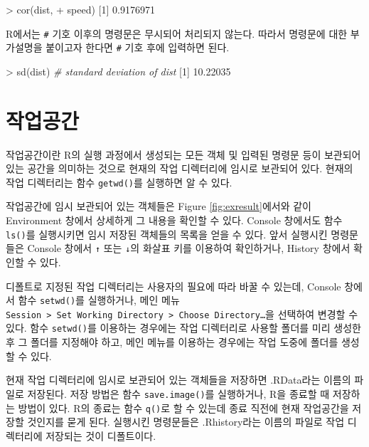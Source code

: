 \documentclass[
]{book}
\newenvironment{Shaded}{\begin{snugshade}}{\end{snugshade}}
\newcommand{\CommentTok}[1]{\textcolor[rgb]{0.56,0.35,0.01}{\textit{#1}}}
\newcommand{\DecValTok}[1]{\textcolor[rgb]{0.00,0.00,0.81}{#1}}
\newcommand{\FloatTok}[1]{\textcolor[rgb]{0.00,0.00,0.81}{#1}}
\newcommand{\FunctionTok}[1]{\textcolor[rgb]{0.00,0.00,0.00}{#1}}
\newcommand{\NormalTok}[1]{#1}
\newcommand{\SpecialCharTok}[1]{\textcolor[rgb]{0.00,0.00,0.00}{#1}}
\begin{document}
\begin{Shaded}
\begin{Highlighting}[]
\SpecialCharTok{\textgreater{}} \FunctionTok{cor}\NormalTok{(dist,}
\SpecialCharTok{+}\NormalTok{     speed)}
\NormalTok{[}\DecValTok{1}\NormalTok{] }\FloatTok{0.9176971}
\end{Highlighting}
\end{Shaded}

R에서는 \texttt{\#} 기호 이후의 명령문은 무시되어 처리되지 않는다. 따라서
명령문에 대한 부가설명을 붙이고자 한다면 \texttt{\#} 기호 후에 입력하면 된다.

\begin{Shaded}
\begin{Highlighting}[]
\SpecialCharTok{\textgreater{}} \FunctionTok{sd}\NormalTok{(dist)  }\CommentTok{\# standard deviation of dist}
\NormalTok{[}\DecValTok{1}\NormalTok{] }\FloatTok{10.22035}
\end{Highlighting}
\end{Shaded}

\hypertarget{uxc791uxc5c5uxacf5uxac04}{%
\section{작업공간}\label{uxc791uxc5c5uxacf5uxac04}}

작업공간이란 R의 실행 과정에서 생성되는 모든 객체 및 입력된 명령문 등이
보관되어 있는 공간을 의미하는 것으로 현재의 작업 디렉터리에 임시로
보관되어 있다. 현재의 작업 디렉터리는 함수 \texttt{getwd()}를 실행하면 알 수
있다.

작업공간에 임시 보관되어 있는 객체들은 Figure \ref{fig:exresult}에서와
같이 Environment 창에서 상세하게 그 내용을 확인할 수 있다. Console
창에서도 함수 \texttt{ls()}를 실행시키면 임시 저장된 객체들의 목록을 얻을 수
있다. 앞서 실행시킨 명령문들은 Console 창에서 \texttt{↑} 또는 \texttt{↓}의 화살표 키를
이용하여 확인하거나, History 창에서 확인할 수 있다.

디폴트로 지정된 작업 디렉터리는 사용자의 필요에 따라 바꿀 수 있는데,
Console 창에서 함수 \texttt{setwd()}를 실행하거나, 메인 메뉴
\texttt{Session\ \textgreater{}\ Set\ Working\ Directory\ \textgreater{}\ Choose\ Directory\ldots{}}을 선택하여 변경할
수 있다. 함수 \texttt{setwd()}를 이용하는 경우에는 작업 디렉터리로 사용할
폴더를 미리 생성한 후 그 폴더를 지정해야 하고, 메인 메뉴를 이용하는
경우에는 작업 도중에 폴더를 생성할 수 있다.

현재 작업 디렉터리에 임시로 보관되어 있는 객체들을 저장하면 .RData라는
이름의 파일로 저장된다. 저장 방법은 함수 \texttt{save.image()}를 실행하거나,
R을 종료할 때 저장하는 방법이 있다. R의 종료는 함수 \texttt{q()}로 할 수 있는데
종료 직전에 현재 작업공간을 저장할 것인지를 묻게 된다. 실행시킨
명령문들은 .Rhistory라는 이름의 파일로 작업 디렉터리에 저장되는 것이
디폴트이다.
\end{document}
